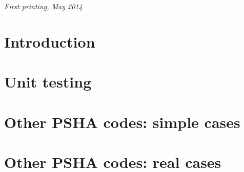 \documentclass[11pt,fleqn]{book} %
\begin{document}
\noindent \textit{First printing, May 2014} %



\pagestyle{empty} %

\tableofcontents %

\cleardoublepage %

\pagestyle{fancy} %

\chapter{Introduction}

\chapter{Unit testing}

\chapter{Other PSHA codes: simple cases}

\chapter{Other PSHA codes: real cases}

\appendix
{} %
\end{document}
